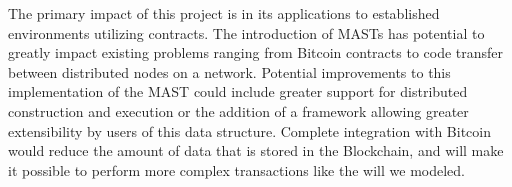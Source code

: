 \documentclass{vldb}
\begin{document}
The primary impact of this project is in its applications to established
environments utilizing contracts. The introduction of MASTs has potential to
greatly impact existing problems ranging from Bitcoin contracts to code
transfer between distributed nodes on a network. Potential improvements to this
implementation of the MAST could include greater support for distributed
construction and execution or the addition of a framework allowing greater
extensibility by users of this data structure. Complete integration with
Bitcoin would reduce the amount of data that is stored in the Blockchain, and
will make it possible to perform more complex transactions like the will we
modeled.



\end{document}
